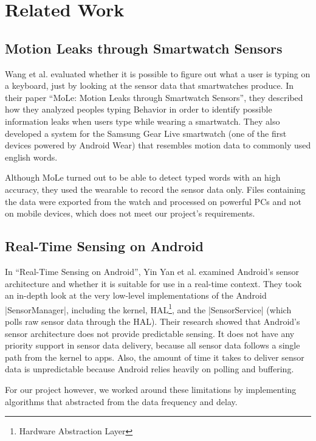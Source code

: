 \section{Related Work}
\label{sec:relatedwork}

\subsection{Motion Leaks through Smartwatch Sensors}
Wang et al. evaluated whether it is possible to figure out what a user is typing on a keyboard, just by looking at the sensor data that smartwatches produce.
In their paper ``MoLe: Motion Leaks through Smartwatch Sensors''\cite{paper:motionleaks}, they described how they analyzed peoples typing Behavior in order to identify possible information leaks when users type while wearing a smartwatch.
They also developed a system for the Samsung Gear Live smartwatch (one of the first devices powered by Android Wear) that resembles motion data to commonly used english words.

Although MoLe turned out to be able to detect typed words with an high accuracy, they used the wearable to record the sensor data only.
Files containing the data were exported from the watch and processed on powerful PCs and not on mobile devices, which does not meet our project's requirements.

\subsection{Real-Time Sensing on Android}
In ``Real-Time Sensing on Android''\cite{paper:realtimesensing}, Yin Yan et al. examined Android’s sensor architecture and whether it is suitable for use in a real-time context.
They took an in-depth look at the very low-level implementations of the Android |SensorManager|\cite{androiddocs:sensormanager}, including the kernel, HAL\footnote{Hardware Abstraction Layer}, and the |SensorService| (which polls raw sensor data through the HAL).
Their research showed that Android's sensor architecture does not provide predictable sensing.
It does not have any priority support in sensor data delivery, because all sensor data follows a single path from the kernel to apps.
Also, the amount of time it takes to deliver sensor data is unpredictable because Android relies heavily on polling and buffering.

For our project however, we worked around these limitations by implementing algorithms that abstracted from the data frequency and delay.

